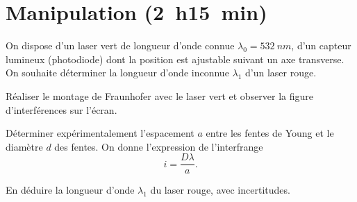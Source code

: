 \section{Manipulation (\SI{2}{h}\SI{15}{min})}

On dispose d'un laser vert de longueur d'onde connue $\lambda_0 = \SI{532}{nm}$, d'un capteur lumineux (photodiode) dont la position est ajustable suivant un axe transverse. On souhaite déterminer la longueur d'onde inconnue $\lambda_1$ d'un laser rouge.

\begin{protocole}
\item Réaliser le montage de Fraunhofer avec le laser vert et observer la figure d'interférences sur l'écran.
\item Déterminer expérimentalement l'espacement $a$ entre les fentes de Young et le diamètre $d$ des fentes. On donne l'expression de l'interfrange 
\begin{equation}
  i = \frac{D \lambda}{a}.
\end{equation}  
\item En déduire la longueur d'onde $\lambda_1$ du laser rouge, avec incertitudes.
\end{protocole}




